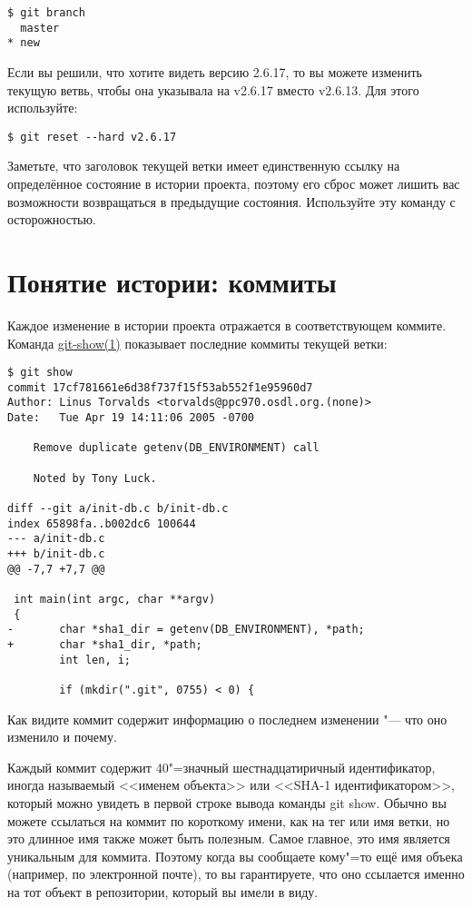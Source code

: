 \documentclass[a4paper, 12pt]{report}
\begin{document}
\begin{lstlisting}
$ git branch
  master
* new
\end{lstlisting}

Если вы решили, что хотите видеть версию 2.6.17, то вы можете изменить текущую ветвь,
чтобы она указывала на v2.6.17 вместо v2.6.13. Для этого используйте:

\begin{lstlisting}
$ git reset --hard v2.6.17
\end{lstlisting}

Заметьте, что заголовок текущей ветки имеет единственную ссылку на определённое состояние
в истории проекта, поэтому его сброс может лишить вас возможности возвращаться в
предыдущие состояния. Используйте эту команду с осторожностью.


\section{Понятие истории: коммиты}

Каждое изменение в истории проекта отражается в соответствующем коммите. Команда
\href{http://www.kernel.org/pub/software/scm/git/docs/git-show.html}{git-show(1)}
показывает последние коммиты текущей ветки:

\begin{lstlisting}
$ git show
commit 17cf781661e6d38f737f15f53ab552f1e95960d7
Author: Linus Torvalds <torvalds@ppc970.osdl.org.(none)>
Date:   Tue Apr 19 14:11:06 2005 -0700

    Remove duplicate getenv(DB_ENVIRONMENT) call

    Noted by Tony Luck.

diff --git a/init-db.c b/init-db.c
index 65898fa..b002dc6 100644
--- a/init-db.c
+++ b/init-db.c
@@ -7,7 +7,7 @@

 int main(int argc, char **argv)
 {
-       char *sha1_dir = getenv(DB_ENVIRONMENT), *path;
+       char *sha1_dir, *path;
        int len, i;

        if (mkdir(".git", 0755) < 0) {
\end{lstlisting}

Как видите коммит содержит информацию о последнем изменении "--- что оно изменило
и почему.

Каждый коммит содержит 40"=значный шестнадцатиричный идентификатор, иногда называемый
<<именем объекта>> или <<SHA-1 идентификатором>>, который можно увидеть в первой
строке вывода команды \textsf{git show}. Обычно вы можете ссылаться на коммит по
короткому имени, как на тег или имя ветки, но это длинное имя также может быть
полезным. Самое главное, это имя является уникальным для коммита. Поэтому когда
вы сообщаете кому"=то ещё имя объека (например, по электронной почте), то вы
гарантируете, что оно ссылается именно на тот объект в репозитории, который вы
имели в виду.
%
%
\end{document}
